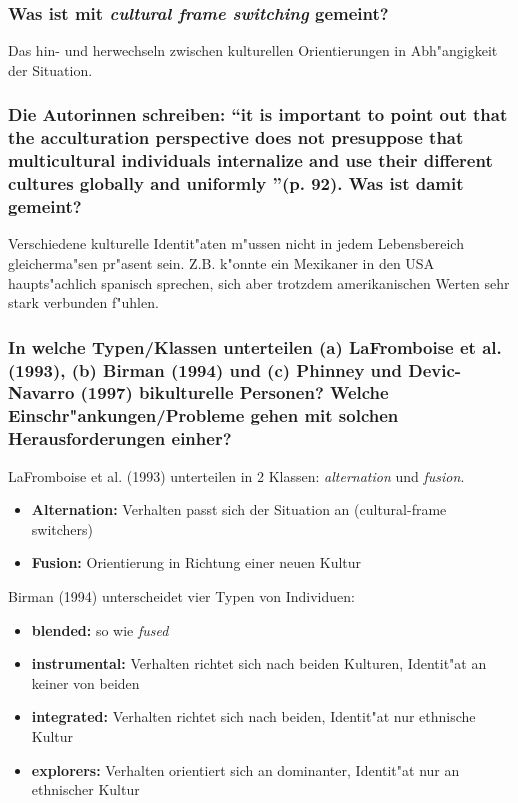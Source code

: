 \subsubsection{Was ist mit \emph{cultural frame switching} gemeint?}
Das hin- und herwechseln zwischen kulturellen Orientierungen in Abh"angigkeit der Situation.

\subsubsection{Die Autorinnen schreiben: ``it is important to point out that the acculturation perspective does not presuppose that multicultural individuals internalize and use their different cultures globally and uniformly ''(p. 92). Was ist damit gemeint?}
Verschiedene kulturelle Identit"aten m"ussen nicht in jedem Lebensbereich gleicherma"sen pr"asent sein. Z.B. k"onnte ein Mexikaner in den USA haupts"achlich spanisch sprechen, sich aber trotzdem amerikanischen Werten sehr stark verbunden f"uhlen.

\subsubsection{In welche Typen/Klassen unterteilen (a) LaFromboise et al. (1993), (b) Birman (1994) und (c) Phinney und Devic-Navarro (1997) bikulturelle Personen? Welche Einschr"ankungen/Probleme gehen mit solchen Herausforderungen einher?}
LaFromboise et al. (1993) unterteilen in 2 Klassen: \emph{alternation} und \emph{fusion}.
\begin{itemize}
        \item \textbf{Alternation:} Verhalten passt sich der Situation an (cultural-frame switchers)
        \item \textbf{Fusion:} Orientierung in Richtung einer neuen Kultur
\end{itemize}

\noindent Birman (1994) unterscheidet vier Typen von Individuen:
\begin{itemize}
        \item \textbf{blended:} so wie \emph{fused}
        \item \textbf{instrumental:} Verhalten richtet sich nach beiden Kulturen, Identit"at an keiner von beiden
        \item \textbf{integrated:} Verhalten richtet sich nach beiden, Identit"at nur ethnische Kultur
        \item \textbf{explorers:} Verhalten orientiert sich an dominanter, Identit"at nur an ethnischer Kultur
\end{itemize}

